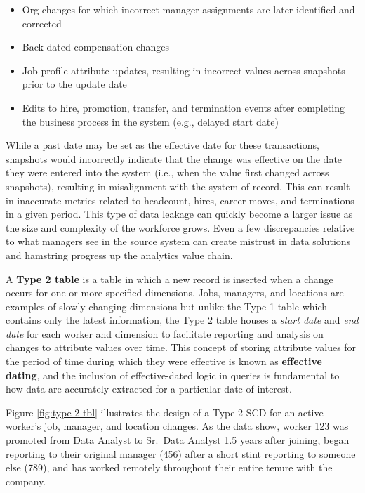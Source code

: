 \documentclass[
]{book}
\providecommand{\tightlist}{%
  \setlength{\itemsep}{0pt}\setlength{\parskip}{0pt}}
\begin{document}
\begin{itemize}
\tightlist
\item
  Org changes for which incorrect manager assignments are later identified and corrected
\item
  Back-dated compensation changes
\item
  Job profile attribute updates, resulting in incorrect values across snapshots prior to the update date
\item
  Edits to hire, promotion, transfer, and termination events after completing the business process in the system (e.g., delayed start date)
\end{itemize}

While a past date may be set as the effective date for these transactions, snapshots would incorrectly indicate that the change was effective on the date they were entered into the system (i.e., when the value first changed across snapshots), resulting in misalignment with the system of record. This can result in inaccurate metrics related to headcount, hires, career moves, and terminations in a given period. This type of data leakage can quickly become a larger issue as the size and complexity of the workforce grows. Even a few discrepancies relative to what managers see in the source system can create mistrust in data solutions and hamstring progress up the analytics value chain.

A \textbf{Type 2 table} is a table in which a new record is inserted when a change occurs for one or more specified dimensions. Jobs, managers, and locations are examples of slowly changing dimensions but unlike the Type 1 table which contains only the latest information, the Type 2 table houses a \emph{start date} and \emph{end date} for each worker and dimension to facilitate reporting and analysis on changes to attribute values over time. This concept of storing attribute values for the period of time during which they were effective is known as \textbf{effective dating}, and the inclusion of effective-dated logic in queries is fundamental to how data are accurately extracted for a particular date of interest.

Figure \ref{fig:type-2-tbl} illustrates the design of a Type 2 SCD for an active worker's job, manager, and location changes. As the data show, worker 123 was promoted from Data Analyst to Sr.~Data Analyst 1.5 years after joining, began reporting to their original manager (456) after a short stint reporting to someone else (789), and has worked remotely throughout their entire tenure with the company.
\end{document}
